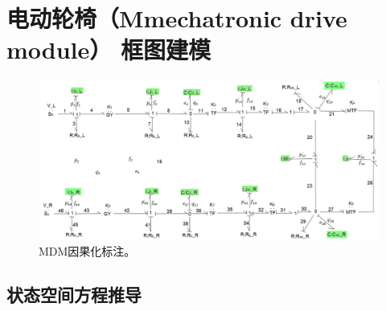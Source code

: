 \clearpage
\section{电动轮椅（Mmechatronic drive module） 框图建模}

\begin{figure}[h]
	\centering
	\includegraphics[width=\textwidth]{fig/MDM.png}
	\caption{MDM因果化标注。}\label{fig:mdm}
\end{figure}
\subsection{状态空间方程推导}
